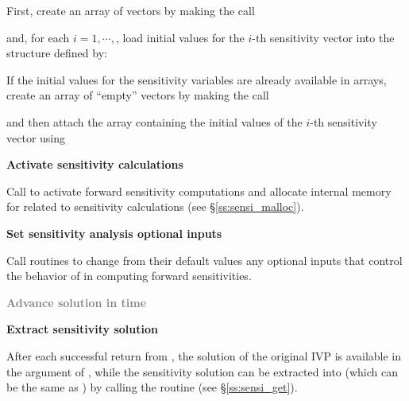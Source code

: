 \begin{Steps}
  First, create an array of  vectors by making the call

  {\s} 

  {\p} 

  and, for each $i=1,\cdots,$, load initial values for the $i$-th sensitivity 
  vector into the structure defined by:

  {\s} 

  {\p} 

  If the initial values for the sensitivity variables are already available in
   arrays, create an array of  ``empty'' vectors by making the call

  {\s} 

  {\p} 

  and then attach the  array  containing the initial values of the
  $i$-th sensitivity vector using

  {\s} 
  
  {\p} 
  
\item
  {\bf Activate sensitivity calculations}

  Call \id{(\ldots);} to activate forward 
  sensitivity computations and allocate internal memory for {\cvodes} related 
  to sensitivity calculations (see \S\ref{ss:sensi_malloc}).

\item
  {\bf Set sensitivity analysis optional inputs}

  Call  routines to change from their default values any
  optional inputs that control the behavior of {\cvodes} in computing forward 
  sensitivities.

\item
  \textcolor{gray}{\bf Advance solution in time}

\item
  {\bf Extract sensitivity solution}

  After each successful return from , the solution of the
  original IVP is available in the  argument of ,
  while the sensitivity solution can be extracted into  (which can 
  be the same as ) by calling the routine 
  (see \S\ref{ss:sensi_get}).


\end{Steps}
